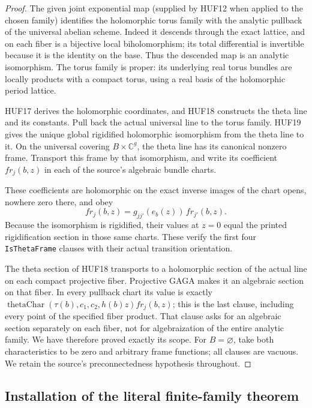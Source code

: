 \documentclass[11pt,a4paper]{article}
\numberwithin{equation}{section}
\theoremstyle{remark}\newtheorem{remark}[theorem]{Remark}
\begin{document}
\begin{proof}
The given joint exponential map (supplied by HUF12
when applied to the chosen family) identifies the holomorphic
torus family with the analytic pullback of
the universal abelian scheme.  Indeed it
descends through the exact lattice, and
on each fiber is a bijective local
biholomorphism; its total differential is
invertible because it is the identity on
the base.  Thus the descended map is an
analytic isomorphism.  The torus family is
proper: its underlying real torus bundles
are locally products with a compact torus,
using a real basis of the holomorphic
period lattice.

HUF17 derives the holomorphic coordinates,
and HUF18 constructs the theta line and
its constants.  Pull back the actual
universal line to the torus family.
HUF19 gives the unique global rigidified
holomorphic isomorphism from the theta
line to it.  On the universal covering
\(B\times\mathbb C^g\), the theta line
has its canonical nonzero frame.
Transport this frame by that isomorphism,
and write its coefficient \(fr_j(b,z)\)
in each of the source's algebraic bundle
charts.

These coefficients are holomorphic on
the exact inverse images of the chart
opens, nowhere zero there, and obey
\[
 fr_j(b,z)=g_{jj'}(e_b(z))\,fr_{j'}(b,z).
 \tag{HUF.16}
\]
Because the isomorphism is rigidified,
their values at \(z=0\) equal the
printed rigidification section in
those same charts.  These verify
the first four \texttt{Is\allowbreak Theta\allowbreak Frame}
clauses with their actual transition
orientation.

The theta section of HUF18 transports
to a holomorphic section of the actual
line on each compact projective fiber.
Projective GAGA makes it an algebraic
section on that fiber.  In every
pullback chart its value is exactly
\(\operatorname{thetaChar}(\tau(b),c_1,c_2,h(b)z)
fr_j(b,z)\); this is the last clause,
including every point of the specified
fiber product.  That clause asks for
an algebraic section separately on
each fiber, not for algebraization
of the entire analytic family.
We have therefore proved exactly its
scope.  For \(B=\varnothing\), take
both characteristics to be zero and
arbitrary frame functions; all clauses
are vacuous.  We retain the source's
preconnectedness hypothesis throughout.
\end{proof}

\subsection{Installation of the literal finite-family theorem}
\end{document}
